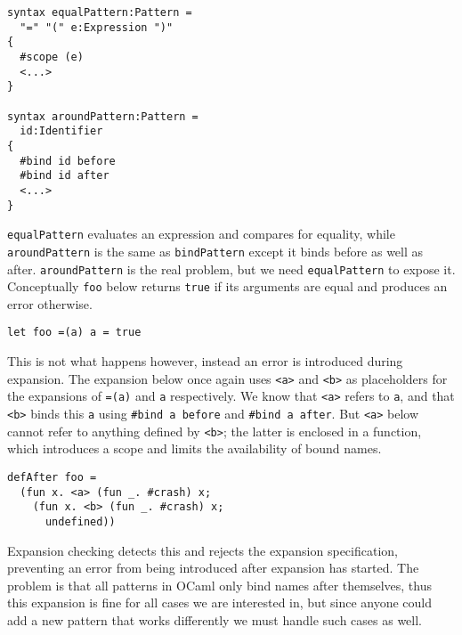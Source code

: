 \documentclass{kththesis}
\begin{document}
\begin{verbatim}
syntax equalPattern:Pattern =
  "=" "(" e:Expression ")"
{
  #scope (e)
  <...>
}

syntax aroundPattern:Pattern =
  id:Identifier
{
  #bind id before
  #bind id after
  <...>
}
\end{verbatim}

\texttt{equalPattern} evaluates an expression and compares for equality, while \texttt{aroundPattern} is the same as \texttt{bindPattern} except it binds before as well as after. \texttt{aroundPattern} is the real problem, but we need \texttt{equalPattern} to expose it. Conceptually \texttt{foo} below returns \texttt{true} if its arguments are equal and produces an error otherwise.

\begin{verbatim}
let foo =(a) a = true
\end{verbatim}

This is not what happens however, instead an error is introduced during expansion. The expansion below once again uses \texttt{<a>} and \texttt{<b>} as placeholders for the expansions of \texttt{=(a)} and \texttt{a} respectively. We know that \texttt{<a>} refers to \texttt{a}, and that \texttt{<b>} binds this \texttt{a} using \texttt{#bind a before} and \texttt{#bind a after}. But \texttt{<a>} below cannot refer to anything defined by \texttt{<b>}; the latter is enclosed in a function, which introduces a scope and limits the availability of bound names.

\begin{verbatim}
defAfter foo =
  (fun x. <a> (fun _. #crash) x;
    (fun x. <b> (fun _. #crash) x;
      undefined))
\end{verbatim}

Expansion checking detects this and rejects the expansion specification, preventing an error from being introduced after expansion has started. The problem is that all patterns in OCaml only bind names after themselves, thus this expansion is fine for all cases we are interested in, but since anyone could add a new pattern that works differently we must handle such cases as well.
\end{document}

